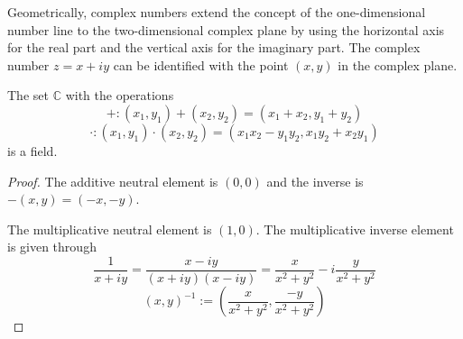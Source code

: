 Geometrically, complex numbers extend the concept of the one-dimensional number line to the two-dimensional complex plane by using the horizontal axis for the real part and the vertical axis for the imaginary part.
The complex number \(z = x + iy\) can be identified with the point \((x, y)\) in the complex plane.






\begin{proposition}
   The set \(\mathbb{C}\) with the operations
   \[+: (x_1, y_1) + (x_2, y_2) = (x_1 + x_2, y_1 + y_2)\]
   \[\cdot: (x_1, y_1) \cdot (x_2, y_2) = (x_1x_2 - y_1y_2, x_1y_2 + x_2y_1)\]
   is a field.
\end{proposition}
\begin{proof}
   The additive neutral element is \((0, 0)\) and the inverse is \(-(x, y) = (-x, -y)\).

   The multiplicative neutral element is \((1, 0)\).
   The multiplicative inverse element is given through
   \[\frac{1}{x + iy} = \frac{x - iy}{(x+iy)(x-iy)} = \frac{x}{x^2 + y^2} - i\frac{y}{x^2 + y^2}\]
   \[(x, y)^{-1} := \left(\frac{x}{x^2 + y^2}, \frac{-y}{x^2 + y^2}\right)\]
\end{proof}

